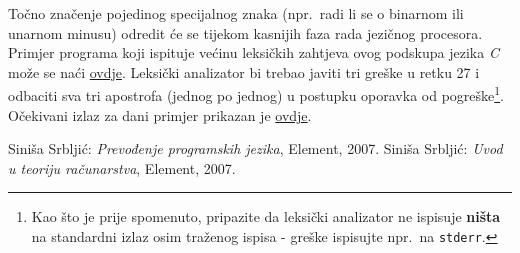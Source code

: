 \documentclass[times, 12pt, utf8]{book}
\begin{document}
Točno značenje pojedinog specijalnog znaka (npr.~radi li se o binarnom ili unarnom minusu) odredit će se tijekom kasnijih faza rada jezičnog procesora.
Primjer programa koji ispituje većinu leksičkih zahtjeva ovog podskupa jezika \emph{C} može se naći \href{https://github.com/fer-ppj/ppj-labosi/raw/master/res/lab1/primjer.simple}{ovdje}.
Leksički analizator bi trebao javiti tri greške u retku 27 i odbaciti sva tri apostrofa (jednog po jednog) u postupku oporavka od pogreške\footnote{Kao što je prije spomenuto, pripazite da leksički analizator ne ispisuje \textbf{ništa} na standardni izlaz osim traženog ispisa - greške ispisujte npr.~na \texttt{stderr}.}.
Očekivani izlaz za dani primjer prikazan je \href{https://github.com/fer-ppj/ppj-labosi/raw/master/res/lab1/simple_primjer_izlaz.txt}{ovdje}.

\newpage
{}
\begin{thebibliography}{10}
Siniša Srbljić:
\emph{Prevođenje programskih jezika}, Element, 2007.
Siniša Srbljić:
\emph{Uvod u teoriju računarstva}, Element, 2007.
\end{thebibliography}
\end{document}
